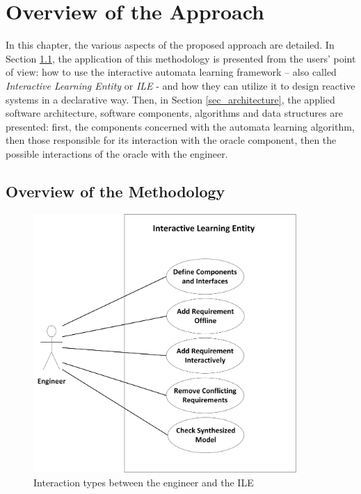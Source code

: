 \chapter{Overview of the Approach}
In this chapter, the various aspects of the proposed approach are detailed. In Section \ref{sec_methodology}, the application of this methodology is presented from the users' point of view: how to use the interactive automata learning framework -- also called \textit{Interactive Learning Entity} or \textit{ILE} - and how they can utilize it to design reactive systems in a declarative way. Then, in Section \ref{sec_architecture}, the applied software architecture, software components, algorithms and data structures are presented: first, the components concerned with the automata learning algorithm, then those responsible for its interaction with the oracle component, then the possible interactions of the oracle with the engineer.
\section{Overview of the Methodology} \label{sec_methodology}
\begin{figure}[!ht] 
	\centering
	
		\includegraphics[width=100mm, keepaspectratio]{figures/methodology_interactiontypes.png}
	\caption{Interaction types between the engineer and the ILE}
	\label{fig_methodology_interactiontypes}
\end{figure}

